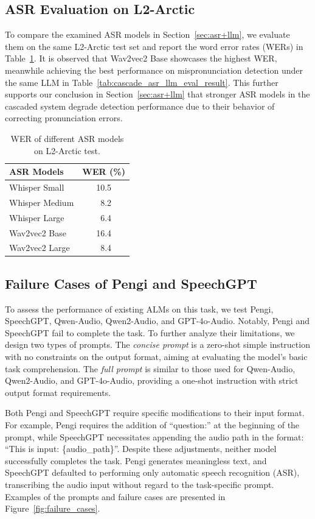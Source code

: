 \documentclass[11pt]{article}
\begin{document}
\subsection{ASR Evaluation on L2-Arctic}
To compare the examined ASR models in Section~\ref {sec:asr+llm}, we evaluate them on the same L2-Arctic test set and report the word error rates (WERs) in Table~\ref{tab:wer_asr_models}. It is observed that Wav2vec2 Base showcases the highest WER, meanwhile achieving the best performance on mispronunciation detection under the same LLM in Table~\ref{tab:cascade_asr_llm_eval_result}. This further supports our conclusion in Section~\ref{sec:asr+llm} that stronger ASR models in the cascaded system degrade detection performance due to their behavior of correcting pronunciation errors.

\begin{table}[ht]
\centering
\small
\begin{tabular}{lc}
\toprule
\textbf{ASR Models} & \textbf{WER (\%)} \\
\midrule
Whisper Small & 10.5 \\
Whisper Medium & \,\,\,8.2 \\
Whisper Large & \,\,\,6.4 \\
Wav2vec2 Base & 16.4 \\
Wav2vec2 Large & \,\,\,8.4 \\
\bottomrule
\end{tabular}
\caption{WER of different ASR models on L2-Arctic test.}
\label{tab:wer_asr_models}
\end{table}

\subsection{Failure Cases of Pengi and SpeechGPT}

To assess the performance of existing ALMs on this task, we test Pengi, SpeechGPT, Qwen-Audio, Qwen2-Audio, and GPT-4o-Audio. Notably, Pengi and SpeechGPT fail to complete the task. To further analyze their limitations, we design two types of prompts. The \textit{concise prompt} is a zero-shot simple instruction with no constraints on the output format, aiming at evaluating the model's basic task comprehension. The \textit{full prompt} is similar to those used for Qwen-Audio, Qwen2-Audio, and GPT-4o-Audio, providing a one-shot instruction with strict output format requirements.

Both Pengi and SpeechGPT require specific modifications to their input format. For example, Pengi requires the addition of ``question:'' at the beginning of the prompt, while SpeechGPT necessitates appending the audio path in the format: ``This is input: \{audio\_path\}''. Despite these adjustments, neither model successfully completes the task. Pengi generates meaningless text, and SpeechGPT defaulted to performing only automatic speech recognition (ASR), transcribing the audio input without regard to the task-specific prompt. Examples of the prompts and failure cases are presented in Figure~\ref{fig:failure_cases}.
\end{document}
